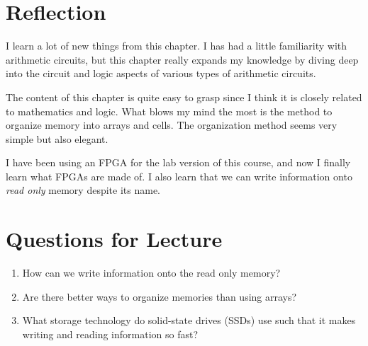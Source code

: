 \documentclass[12pt]{article}
\numberwithin{figure}{subsection}
\numberwithin{table}{subsection}
\numberwithin{equation}{subsection}
\begin{document}


\section{Reflection}

I learn a lot of new things from this chapter. I has had a little familiarity with arithmetic circuits, but this chapter really expands my knowledge by diving deep into the circuit and logic aspects of various types of arithmetic circuits.

The content of this chapter is quite easy to grasp since I think it is closely related to mathematics and logic. What blows my mind the most is the method to organize memory into arrays and cells. The organization method seems very simple but also elegant.

I have been using an FPGA for the lab version of this course, and now I finally learn what FPGAs are made of. I also learn that we can write information onto \textit{read only} memory despite its name.

\section{Questions for Lecture}

\begin{enumerate}
  \item How can we write information onto the read only memory?
  \item Are there better ways to organize memories than using arrays?
  \item What storage technology do solid-state drives (SSDs) use such that it makes writing and reading information so fast?
\end{enumerate}
\end{document}

